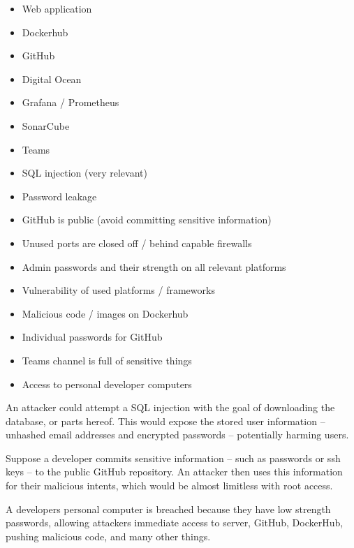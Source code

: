 \documentclass{article}
\begin{document}
\begin{itemize}
    \item Web application
    \item Dockerhub
    \item GitHub
    \item Digital Ocean
    \item Grafana / Prometheus
    \item SonarCube
    \item Teams
\end{itemize}


\begin{itemize}
    \item SQL injection (very relevant)
    \item Password leakage
    \item GitHub is public (avoid committing sensitive information)
    \item Unused ports are closed off / behind capable firewalls
    \item Admin passwords and their strength on all relevant platforms
    \item Vulnerability of used platforms / frameworks
    \item Malicious code / images on Dockerhub
    \item Individual passwords for GitHub
    \item Teams channel is full of sensitive things
    \item Access to personal developer computers
\end{itemize}


An attacker could attempt a SQL injection with the goal of downloading the database, or parts hereof. This would expose the stored user information -- unhashed email addresses and encrypted passwords -- potentially harming users.

Suppose a developer commits sensitive information -- such as passwords or ssh keys -- to the public GitHub repository. An attacker then uses this information for their malicious intents, which would be almost limitless with root access.

A developers personal computer is breached because they have low strength passwords, allowing attackers immediate access to server, GitHub, DockerHub, pushing malicious code, and many other things.
\end{document}
